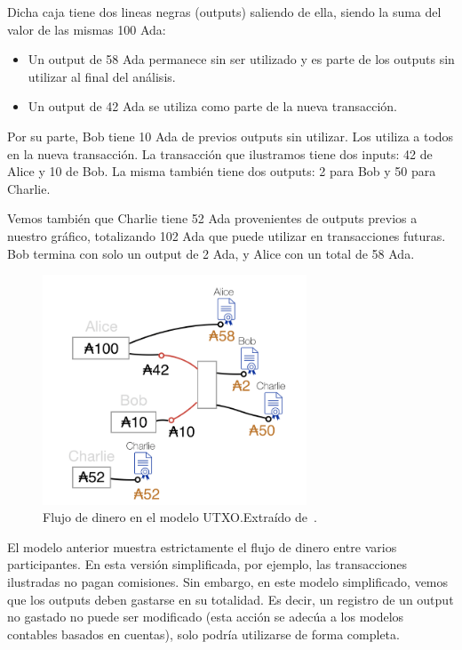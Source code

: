 \documentclass[12pt]{book}
\begin{document}
Dicha caja tiene dos lineas negras (outputs) saliendo de ella, siendo la suma del valor de las mismas 100 Ada:

\begin{itemize}
	\item Un output de 58 Ada permanece sin ser utilizado y es parte de los outputs sin utilizar al final del análisis.
	\item Un output de 42 Ada se utiliza como parte de la nueva transacción.
\end{itemize}

Por su parte, Bob tiene 10 Ada de previos outputs sin utilizar. Los utiliza a todos en la nueva transacción. La transacción que ilustramos tiene dos inputs: 42 de Alice y 10 de Bob. La misma también tiene dos outputs: 2 para Bob y 50 para Charlie.

Vemos también que Charlie tiene 52 Ada provenientes de outputs previos a nuestro gráfico, totalizando 102 Ada que puede utilizar en transacciones futuras. Bob termina con solo un output de 2 Ada, y Alice con un total de 58 Ada.

\begin{figure}
	\centering
	\includegraphics[width=0.7\textwidth]{UTXO_Funds_Flow_Example.png}
	\caption{Flujo de dinero en el modelo UTXO.\@ Extraído de~\cite{plutus-smart-contracts}.}\label{fig:UTXO_Funds_Flow_Example}
\end{figure}

El modelo anterior muestra estrictamente el flujo de dinero entre varios participantes. En esta versión simplificada, por ejemplo, las transacciones ilustradas no pagan comisiones. Sin embargo, en este modelo simplificado, vemos que los outputs deben gastarse en su totalidad. Es decir, un registro de un output no gastado no puede ser modificado (esta acción se adecúa a los modelos contables basados en cuentas), solo podría utilizarse de forma completa.
\end{document}
